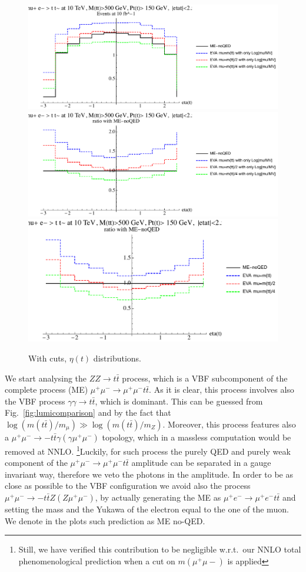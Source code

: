 \documentclass[a4paper,11pt]{article}
\begin{document}
\begin{figure}[!t]
\includegraphics[width=0.46\linewidth]{Notebooks/PlotDistr/ZZ_tt/10TeVcuts/plotetat.pdf}
\includegraphics[width=0.46\linewidth]{Notebooks/PlotDistr/ZZ_tt/10TeVcuts/plotetatratio1.pdf}
\includegraphics[width=0.46\linewidth]{Notebooks/PlotDistr/ZZ_tt/10TeVcuts/plotetatratio2.pdf}
\caption{With cuts, $\eta(t)$ distributions. \label{fig:cutsZZtt2}}
\end{figure}



We start analysing the $ZZ\to t \bar t$ process, which is a VBF subcomponent of the complete process (ME) $\mu^+\mu^-\to\mu^+\mu^- t \bar t$. As it is clear, this process involves also the VBF process $\gamma \gamma \to t \bar t$, which is dominant. This can be guessed from Fig.~\ref{fig:lumicomparison} and by the fact that $\log(m(t\bar t)/m_\mu)\gg \log(m(t\bar t)/m_Z)$. Moreover, this process features also a $\mu^+\mu^-\to- t \bar t \gamma (\gamma\mu^+\mu^-)$ topology, which in a massless computation would be removed at NNLO. \footnote{Still, we have verified this contribution to be negligible w.r.t.~our NNLO total phenomenological prediction when a cut on $m(\mu^+ \mu-)$ is applied }Luckily, for such process the purely QED and purely weak component of the $\mu^+\mu^-\to\mu^+\mu^- t \bar t$ amplitude can be separated in a gauge invariant way, therefore we veto the photons in the amplitude. In order to be as close as possible to the VBF configuration we avoid also the process $\mu^+\mu^-\to- t \bar t Z (Z \mu^+\mu^- )$, by actually generating the ME as $\mu^+e^-\to\mu^+e^- t \bar t$ and setting the mass and the Yukawa of the electron equal to the one of the muon. We denote in the plots such prediction as ME no-QED.
\end{document}
